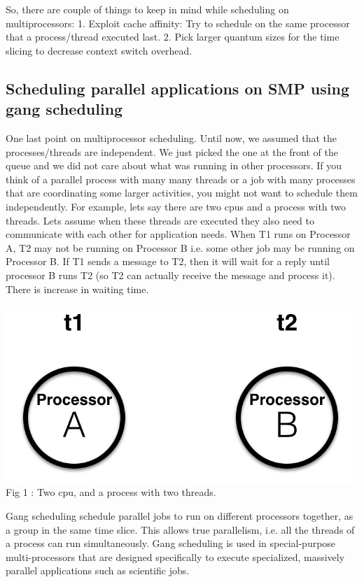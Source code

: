 \documentclass[twoside]{article}
\begin{document}
So, there are couple of things to keep in mind while scheduling on multiprocessors: 1. Exploit cache affinity: Try to schedule on the same processor that a process/thread executed last. 2. Pick larger quantum sizes for the time slicing to decrease context switch overhead.

\subsection{Scheduling parallel applications on SMP using gang scheduling}

One last point on multiprocessor scheduling. Until now, we assumed that the processes/threads are independent. We just picked the one at the front of the queue and we did not care about what was running in other processors. If you think of a parallel process with many many threads or a job with many processes that are coordinating some larger activities, you might not want to schedule them independently. For example, let\textsc{}s say there are two cpu\textsc{}s and a process with two threads. Let\textsc{}s assume when these threads are executed they also need to communicate with each other for application needs. When T1 runs on Processor A, T2 may not be running on Processor B i.e. some other job may be running on Processor B. If T1 sends a message to T2, then it will wait for a reply until processor B runs T2 (so T2 can actually receive the message and process it). There is increase in waiting time. 

\begin{center}
  \includegraphics[scale=0.4]{cpu_process.png}\\
  Fig 1 : Two cpu, and a process with two threads.
\end{center} 

Gang scheduling schedule parallel jobs to run on different processors together, as a group in the same time slice. This allows true parallelism, i.e. all the threads of a process can run simultaneously. Gang scheduling is used in special-purpose multi-processors that are designed specifically to execute specialized, massively parallel applications such as scientific jobs.
\end{document}
